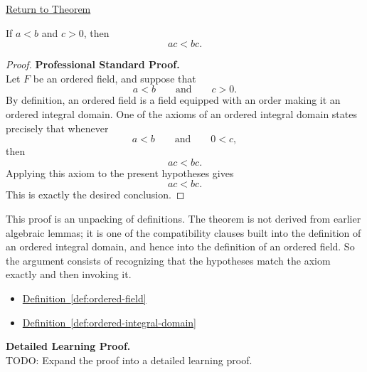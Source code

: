 \newpage
{}
\label{prf:multiply-positive}

\begin{remark*}[Return]
\hyperref[thm:multiply-positive]{Return to Theorem}
\end{remark*}

\begin{theorem*}
If $a<b$ and $c>0$, then
\[
ac<bc.
\]
\end{theorem*}

\begin{proof}
\textbf{Professional Standard Proof.}~\\
Let $F$ be an ordered field, and suppose that
\[
a<b
\qquad\text{and}\qquad
c>0.
\]
By definition, an ordered field is a field equipped with an order making it
an ordered integral domain.  One of the axioms of an ordered integral domain
states precisely that whenever
\[
a<b
\qquad\text{and}\qquad
0<c,
\]
then
\[
ac<bc.
\]
Applying this axiom to the present hypotheses gives
\[
ac<bc.
\]
This is exactly the desired conclusion.
\end{proof}

\begin{remark*}
This proof is an unpacking of definitions.  The theorem is not derived from
earlier algebraic lemmas; it is one of the compatibility clauses built into
the definition of an ordered integral domain, and hence into the definition
of an ordered field.  So the argument consists of recognizing that the
hypotheses match the axiom exactly and then invoking it.
\end{remark*}

\begin{dependencies}
\begin{itemize}
  \item \hyperref[def:ordered-field]{Definition~\ref*{def:ordered-field}}
  \item \hyperref[def:ordered-integral-domain]{Definition~\ref*{def:ordered-integral-domain}}
\end{itemize}
\end{dependencies}

\textbf{Detailed Learning Proof.}~\\
TODO: Expand the proof into a detailed learning proof.

